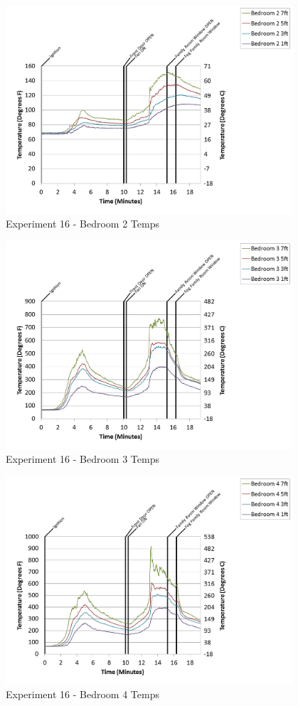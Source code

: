 \documentclass{article}
\begin{document}
\begin{appendices}
\begin{figure}[h!]
	\centering
	\includegraphics[height=3.05in]{0_Images/Results_Charts/Exp_16_Charts/Bedroom2Temps.png}
	\caption{Experiment 16 - Bedroom 2 Temps}
\end{figure}

\clearpage

\begin{figure}[h!]
	\centering
	\includegraphics[height=3.05in]{0_Images/Results_Charts/Exp_16_Charts/Bedroom3Temps.png}
	\caption{Experiment 16 - Bedroom 3 Temps}
\end{figure}


\begin{figure}[h!]
	\centering
	\includegraphics[height=3.05in]{0_Images/Results_Charts/Exp_16_Charts/Bedroom4Temps.png}
	\caption{Experiment 16 - Bedroom 4 Temps}
\end{figure}


\end{appendices}
\end{document}
